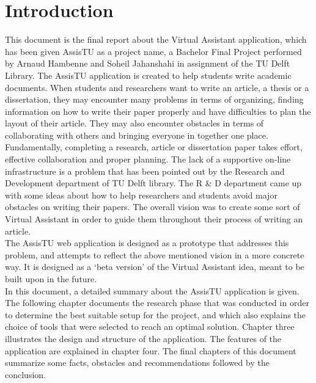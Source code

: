 \chapter{Introduction}

This document is the final report about the Virtual Assistant application, which has been given AssisTU as a project name, a Bachelor Final Project performed by Arnaud Hambenne and Soheil Jahanshahi in
assignment of the TU Delft Library. 
The AssisTU application is created to help students write academic documents. When students and researchers want to write an article, a thesis or a dissertation, they may encounter many problems in terms of organizing, finding information on how to write their paper properly and have difficulties to plan the layout of their article. They may also encounter obstacles in terms of collaborating with others and bringing everyone in together one 
place. \\

Fundamentally, completing a research, article or dissertation paper takes effort, effective collaboration and proper planning. The lack of a supportive
on-line infrastructure is a problem that has been pointed out by the Research and Development department of TU Delft library. The R \& D department came 
up with some ideas about how to help researchers and students avoid major obstacles on writing their papers. The overall vision was to create some sort of Virtual Assistant in order to guide them throughout their process of writing an article.\\

The AssisTU web application is designed as a prototype that addresses this problem, and attempts to reflect the above mentioned vision in a more concrete way. It is designed as a `beta version' of the Virtual Assistant idea, meant to be built upon in the future.\\ 

In this document, a detailed summary about the AssisTU application is given. The following chapter documents the research phase that was conducted in order to determine the best suitable setup for the project, and which also explains the choice of tools that were selected to reach an optimal solution. 
Chapter three illustrates the design and structure of the application. The features of the application are explained in chapter four. The final chapters of this document summarize some facts, obstacles and recommendations followed by the conclusion.  